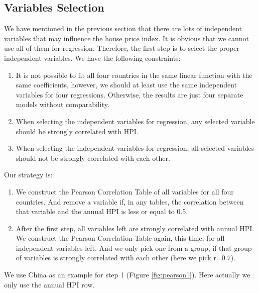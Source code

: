 \documentclass[11pt]{article}
\begin{document}
\subsection{Variables Selection}\label{variables_selection}
We have mentioned in the previous section that there are lots of independent variables that may influence the house price index. It is obvious that we cannot use all of them for regression. Therefore, the first step is to select the proper independent variables. We have the following constraints:
\begin{enumerate}
    \item It is not possible to fit all four countries in the same linear function with the same coefficients, however, we should at least use the same independent variables for four regressions. Otherwise, the results are just four separate models without comparability.
    \item When selecting the independent variables for regression, any selected variable should be strongly correlated with HPI.
    \item When selecting the independent variables for regression, all selected variables should not be strongly correlated with each other.
\end{enumerate}
Our strategy is\citep{Feature}:
\begin{enumerate}
    \item We construct the Pearson Correlation Table of all variables for all four countries. And remove a variable if, in any tables, the correlation between that variable and the annual HPI is less or equal to 0.5.
    \item After the first step, all variables left are strongly correlated with annual HPI. We construct the Pearson Correlation Table again, this time, for all independent variables left. And we only pick one from a group, if that group of variables is strongly correlated with each other (here we pick r=0.7). 
\end{enumerate}

We use China as an example for step 1 (Figure \ref{fig:pearson1}). Here actually we only use the annual HPI row.
\end{document}
